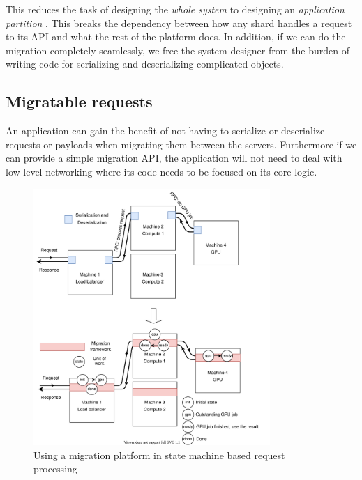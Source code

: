 This reduces the task of designing the \emph{whole system} to designing an
    \emph{application partition}
    . This breaks the dependency between how
    any shard handles a request to its API and what the rest of the
    platform does. In addition, if we can do the migration completely
    seamlessly, we free the system designer from the burden of
    writing code for serializing and deserializing complicated objects.



\subsection{Migratable requests}
\label{sec:migreqs}
An application can gain the benefit of not having to serialize or deserialize
requests or payloads when migrating them between the servers. Furthermore if
we can provide a simple migration API, the application will not need to deal
with low level networking where its code needs to be focused on its core logic.


\begin{figure}[t]
\centering
{}
\includegraphics[width=0.8\textwidth]{migration-transport.drawio}
\caption{
    Using a migration platform in state machine based request processing
}
\label{fig:migrationtransport}
\end{figure}

